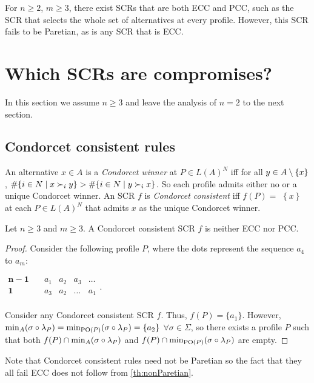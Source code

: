 \documentclass[version=3.21, pagesize, twoside=off, bibliography=totoc, DIV=calc, fontsize=12pt, a4paper]{scrartcl}
\begin{document}
\begin{remark}
	For $n ≥ 2$, $m ≥ 3$, there exist \acp{SCR} that are both ECC and PCC, such as the \ac{SCR} that selects the whole set of alternatives at every profile. However, this \ac{SCR} fails to be Paretian, as is any \ac{SCR} that is ECC.
\end{remark}


\section{Which \acp{SCR} are compromises?}
\label{sec:more2voters}
In this section we assume $n\geq 3$ and leave the analysis of $n=2$ to the
next section.

\subsection{Condorcet consistent rules}

An alternative $x\in A$ is a \emph{Condorcet winner} at $P\in L(A)^{N}$ iff for all $y\in A \setminus \{x\} $, $\#\set{i \in N \suchthat x \prefi y} >\#\set{i \in N \suchthat y \prefi x}$. So each profile admits
either no or a unique Condorcet winner. An \ac{SCR} $f$ is \emph{Condorcet
consistent} iff $f(P)=$ $\left\{ x\right\} $ at each $P\in L(A)^{N}$ that
admits $x$ as the unique Condorcet winner.

\begin{theorem} \label{th:condorcet}
Let $n\geq 3$ and $m\geq 3$. A Condorcet consistent \ac{SCR} $f$ is neither ECC nor PCC.
\end{theorem}
\begin{proof}
Consider the following profile $P$, where the dots represent the sequence $a_4$ to $a_m$:
	\begin{center}
		$
		\begin{array}{cccccc}
		\mathbf{n-1} \quad &a_1&a_2&a_3&\dots\\
		\mathbf{1} \quad &a_3&a_2&\dots&a_1\\
		\end{array}
		$.
	\end{center}

Consider any Condorcet consistent \ac{SCR} $f$. Thus, $f(P)=\{a_1\}$. However, $\musigma=\mustar=\{a_2\}$ $\forall \sigma \in \Sigma$, so there exists a profile $P$ such that both $f(P)\cap \musigma$ and $f(P)\cap \mustar$ are empty.
\end{proof}

Note that Condorcet consistent rules need not be Paretian so the fact that they all fail ECC does not follow from \cref{th:nonParetian}. 
\end{document}
